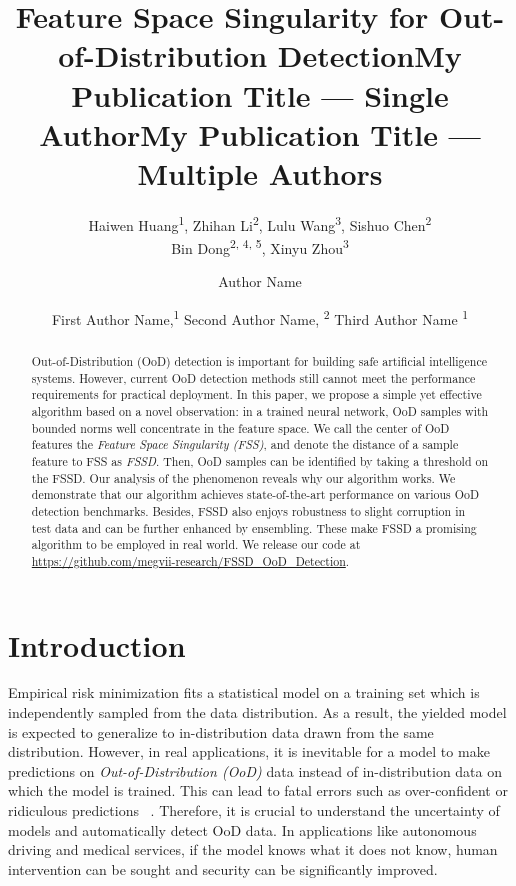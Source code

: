 \documentclass[letterpaper]{article}
\title{Feature Space Singularity for Out-of-Distribution Detection}
\author{Haiwen Huang\textsuperscript{\rm 1}, Zhihan Li\textsuperscript{\rm 2}, Lulu Wang\textsuperscript{\rm 3}, Sishuo Chen\textsuperscript{\rm 2}\\
Bin Dong\textsuperscript{\rm 2, 4, 5}, Xinyu Zhou\textsuperscript{\rm 3}\\
}
\title{My Publication Title --- Single Author}
\author {
Author Name \\
}
\title{My Publication Title --- Multiple Authors}
\author {
First Author Name,\textsuperscript{\rm 1}
    Second Author Name, \textsuperscript{\rm 2}
    Third Author Name \textsuperscript{\rm 1} \\
}
\begin{document}
\maketitle

\begin{abstract}
Out-of-Distribution (OoD) detection is important for building safe artificial intelligence systems.
However, current OoD detection methods still cannot meet the performance requirements for practical deployment.
In this paper, we propose a simple yet effective algorithm based on a novel observation: in a trained neural network, OoD samples with bounded norms well concentrate in the feature space.
We call the center of OoD features the \emph{Feature Space Singularity (FSS)}, and denote the distance of a sample feature to FSS as \emph{FSSD}.
Then, OoD samples can be identified by taking a threshold on the FSSD.
Our analysis of the phenomenon  reveals why our algorithm works.
We demonstrate that our algorithm achieves state-of-the-art performance on various OoD detection benchmarks. Besides, FSSD also enjoys robustness to slight corruption in test data and can be further enhanced by ensembling. These make FSSD a promising algorithm to be employed in real world. We release our code at \url{https://github.com/megvii-research/FSSD_OoD_Detection}.

\end{abstract}

\section{Introduction}\label{introduction}

Empirical risk minimization fits a statistical model on a training set which is independently sampled from the  data distribution.
As a result, the yielded model is expected to generalize to in-distribution data drawn from the same distribution.
However, in real applications, it is inevitable for a model to make predictions on \emph{Out-of-Distribution (OoD)} data instead of in-distribution data on which the model is trained.
This can lead to fatal errors such as over-confident or ridiculous
predictions ~\cite{whyRelu, FailingLoudly}.
Therefore, it is crucial to understand the uncertainty of models and automatically detect OoD data.
In applications like autonomous driving and medical services, if the model knows what it does not know, human intervention can be sought and security can be significantly improved.
\end{document}

